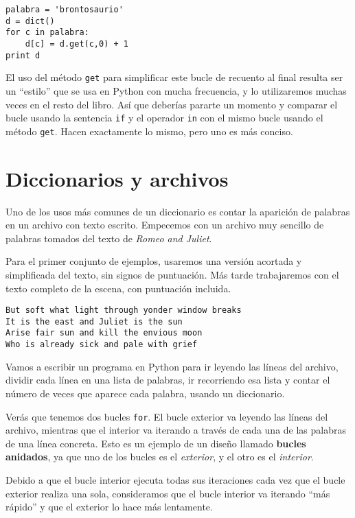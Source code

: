 \beforeverb
\begin{verbatim}
palabra = 'brontosaurio'
d = dict()
for c in palabra:
    d[c] = d.get(c,0) + 1
print d
\end{verbatim}
\afterverb
%
El uso del método {\tt get} para simplificar este bucle de recuento
al final resulta ser un ``estilo'' que se usa en Python con mucha frecuencia, y
lo utilizaremos muchas veces en el resto del libro. Así que deberías
pararte un momento y comparar el bucle usando la sentencia {\tt if}
y el operador {\tt in} con el mismo bucle usando el método {\tt get}.
Hacen exactamente lo mismo, pero uno es más conciso.

\section{Diccionarios y archivos}

Uno de los usos más comunes de un diccionario es contar la aparición
de palabras en un archivo con texto escrito.
Empecemos con un archivo muy sencillo de
palabras tomados del texto de \emph{Romeo and Juliet}.

Para el primer conjunto de ejemplos, usaremos una versión acortada y simplificada
del texto, sin signos de puntuación. Más tarde trabajaremos con el texto completo
de la escena, con puntuación incluida.

\beforeverb
\begin{verbatim}
But soft what light through yonder window breaks
It is the east and Juliet is the sun
Arise fair sun and kill the envious moon
Who is already sick and pale with grief
\end{verbatim}
\afterverb
%
Vamos a escribir un programa en Python para ir leyendo las líneas del archivo,
dividir cada línea en una lista de palabras, ir recorriendo esa lista
y contar el número de veces que aparece cada palabra, usando un diccionario.

Verás que tenemos dos bucles {\tt for}. El bucle exterior va leyendo las
líneas del archivo, mientras que el interior va iterando a través de cada
una de las palabras de una línea concreta. Esto es un ejemplo
de un diseño llamado {\bf bucles anidados}, ya que uno de los bucles
es el \emph{exterior}, y el otro es el \emph{interior}.

Debido a que el bucle interior ejecuta todas sus iteraciones cada vez
que el bucle exterior realiza una sola, consideramos
que el bucle interior va iterando ``más rápido'' y que el exterior lo hace
más lentamente.

